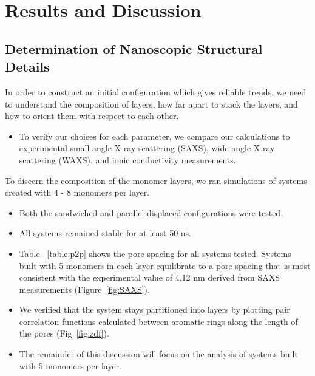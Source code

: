 \documentclass{article}
\begin{document}
  \section*{Results and Discussion}
  
  \subsection*{Determination of Nanoscopic Structural Details}
  
  In order to construct an initial configuration which gives reliable 
  trends, we need to understand the composition of layers, how far apart
  to stack the layers, and how to orient them with respect to each other.
  \begin{itemize}
  	\item To verify our choices for each parameter, we compare our calculations
	to experimental small angle X-ray scattering (SAXS), wide angle X-ray
	scattering (WAXS), and ionic conductivity measurements.
  \end{itemize}
  
  To discern the composition of the monomer layers, we ran simulations of 
  systems created with 4 - 8 monomers per layer.
  \begin{itemize}
  	\item Both the sandwiched and parallel displaced configurations were tested.
	\item All systems remained stable for at least 50 ns.

	\item Table ~\ref{table:p2p} shows the pore spacing for all systems tested. 
	Systems built with 5 monomers in each layer equilibrate to a pore spacing
	that is most consistent with the experimental value of 4.12 nm derived from
	SAXS measurements (Figure~\ref{fig:SAXS}).
	\item We verified that the system stays partitioned into layers by plotting 
	pair correlation functions calculated between aromatic rings along the length
	of the pores (Fig~\ref{fig:zdf}).
	\item The remainder of this discussion will focus on the analysis of systems
	built with 5 monomers per layer. 
  \end{itemize}
  
\end{document}
